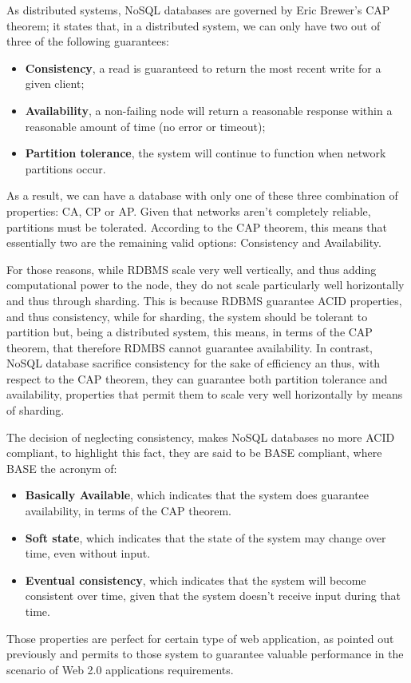 \noindent As distributed systems, NoSQL databases are governed by Eric Brewer's CAP theorem; it states that, in a distributed system, we can only have two out of three of the following guarantees:
\begin{itemize}
\item \textbf{Consistency}, a read is guaranteed to return the most recent write for a given client;
\item \textbf{Availability}, a non-failing node will return a reasonable response within a reasonable amount of time (no error or timeout);
\item \textbf{Partition tolerance}, the system will continue to function when network partitions occur.
\end{itemize}

\noindent As a result, we can have a database with only one of these three combination of properties: CA, CP or AP.
Given that networks aren't completely reliable, partitions must be tolerated. According to the CAP theorem, this means that essentially two are the remaining valid options: Consistency and Availability.

\noindent For those reasons, while RDBMS scale very well vertically, and thus adding computational power to the node, they do not scale particularly well horizontally and thus through sharding. This is because RDBMS guarantee ACID properties, and thus consistency, while for sharding, the system should be tolerant to partition but, being a distributed system, this means, in terms of the CAP theorem, that therefore RDMBS cannot guarantee availability. In contrast, NoSQL database sacrifice consistency for the sake of efficiency an thus, with respect to the CAP theorem, they can guarantee both partition tolerance and availability, properties that permit them to scale very well horizontally by means of sharding.

\noindent The decision of neglecting consistency, makes NoSQL databases no more ACID compliant, to highlight this fact, they are said to be BASE compliant, where BASE the acronym of:
\begin{itemize}
\item \textbf{Basically Available}, which indicates that the system does guarantee availability, in terms of the CAP theorem.
\item \textbf{Soft state}, which indicates that the state of the system may change over time, even without input. 
\item \textbf{Eventual consistency}, which indicates that the system will become consistent over time, given that the system doesn't receive input during that time.
\end{itemize}
\noindent Those properties are perfect for certain type of web application, as pointed out previously and permits to those system to guarantee valuable performance in the scenario of Web 2.0 applications requirements.


